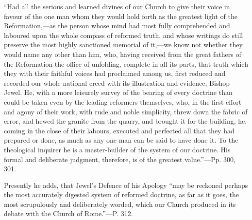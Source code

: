 ``Had
all the serious and learned divines of our Church to give their voice
in favour of the one man whom they would hold forth as the greatest
light of the Reformation,—as the person whose mind had most fully
comprehended and laboured upon the whole compass of reformed truth,
and whose writings do still preserve the most highly sanctioned
memorial of it,—we know not whether they would name any other than
him, who, having received from the great fathers of the Reformation
the office of unfolding, complete in all its parts, that truth which
they with their faithful voices had proclaimed
among us, first reduced and recorded our whole national creed with its
illustration and evidence, Bishop Jewel. He, with a more leisurely
survey of the bearing of every doctrine than could be taken even by
the leading reformers themselves, who, in the first effort and agony
of their work, with rude and noble simplicity, threw down the fabric
of error, and hewed the granite from the quarry, and brought it for
the building, he, coming in the close of their labours, executed and
perfected all that they had prepared or done, as much as any one man
can be said to have done it. To the theological inquirer he is a
master-builder of the system of our doctrine. His formal and
deliberate judgment, therefore, is of the greatest value.''—Pp. 300,
301.

Presently he adds, that Jewel's Defence of his
Apology ``may be reckoned perhaps the most accurately digested system
of reformed doctrine, as far as it goes, the most scrupulously and
deliberately worded, which our Church produced in its debate with the
Church of Rome.''—P. 312.

